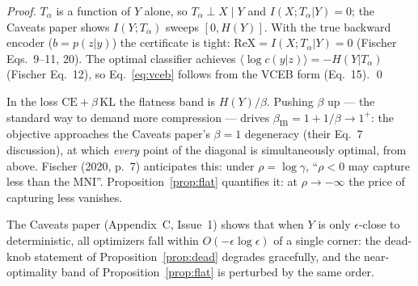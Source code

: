 \begin{proof}
$T_\alpha$ is a function of $Y$ alone, so $T_\alpha \perp X \mid Y$ and
$I(X;T_\alpha|Y) = 0$; the Caveats paper shows $I(Y;T_\alpha)$ sweeps $[0, H(Y)]$.
With the true backward encoder ($b = p(z|y)$) the certificate is tight:
$\mathrm{ReX} = I(X;T_\alpha|Y) = 0$ (Fischer Eqs.~9--11, 20). The optimal classifier
achieves $\langle \log c(y|z)\rangle = -H(Y|T_\alpha)$ (Fischer Eq.~12), so
Eq.~\eqref{eq:vceb} follows from the VCEB form (Eq.~15). \hfill\qed
\end{proof}

\begin{remark}\label{rem:convention}
In the loss $\mathrm{CE} + \beta\,\mathrm{KL}$ the flatness band is $H(Y)/\beta$.
Pushing $\beta$ up --- the standard way to demand more compression --- drives
$\beta_{\mathrm{IB}} = 1 + 1/\beta \to 1^+$: the objective approaches the Caveats
paper's $\beta = 1$ degeneracy (their Eq.~7 discussion), at which \emph{every} point of
the diagonal is simultaneously optimal, from above. Fischer (2020, p.~7) anticipates
this: under $\rho = \log\gamma$, ``$\rho < 0$ may capture less than the MNI''.
Proposition~\ref{prop:flat} quantifies it: at $\rho \to -\infty$ the price of capturing
less vanishes.
\end{remark}

\begin{remark}\label{rem:approx}
The Caveats paper (Appendix~C, Issue~1) shows that when $Y$ is only $\epsilon$-close to
deterministic, all optimizers fall within $O(-\epsilon\log\epsilon)$ of a single corner:
the dead-knob statement of Proposition~\ref{prop:dead} degrades gracefully, and the
near-optimality band of Proposition~\ref{prop:flat} is perturbed by the same order.
\end{remark}

